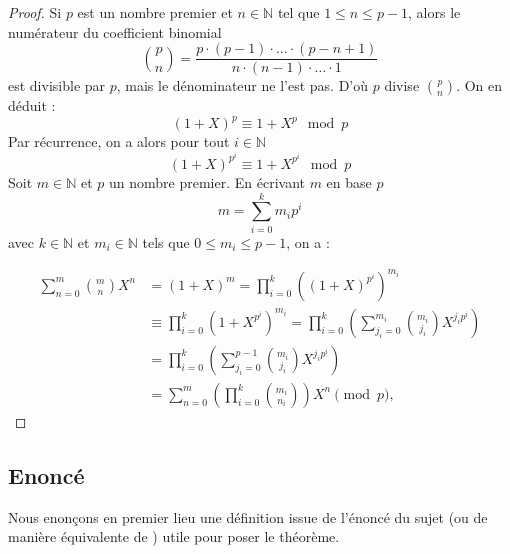 \documentclass{article}
\theoremstyle{definition}
\theoremstyle{plain}
\theoremstyle{plain}
\theoremstyle{plain}
\theoremstyle{plain}
\theoremstyle{definition}
\theoremstyle{plain}
\theoremstyle{plain}
\begin{document}
\begin{proof}
	Si \( p \) est un nombre premier et \( n \in \mathbb{N}\) tel que \( 1 \leq n \leq p-1 \), alors le numérateur du coefficient binomial 
\begin{equation*}
	\binom{p}{n} = \frac{p \cdot (p-1) \cdot \ldots \cdot (p-n+1)}{n \cdot (n-1) \cdot \ldots \cdot 1}
\end{equation*}
est divisible par \( p \), mais le dénominateur ne l'est pas. D'où \( p \) divise \( \binom{p}{n} \). On en déduit : 
\begin{equation*}
	(1 + X)^p \equiv 1 + X^p \mod{p}
\end{equation*}
Par récurrence, on a alors pour tout \( i \in \mathbb{N} \)
\begin{equation*}
	(1 + X)^{p^i} \equiv 1 + X^{p^i} \mod{p}
\end{equation*}
Soit \( m \in \mathbb{N}\) et \( p \) un nombre premier. 
En écrivant \( m \) en base \( p \) 
\begin{equation*}
	m = \sum_{i=0}^{k} m_i p^i
\end{equation*}
avec \( k \in \mathbb{N} \) et \( m_i \in \mathbb{N} \) tels que \( 0 \leq m_i \leq p-1 \), on a : 

\begin{align*}
	\sum_{n=0}^{m} \binom{m}{n} X^n &= (1+X)^m = \prod_{i=0}^{k} \left((1+X)^{p^i}\right)^{m_i} \\
&\equiv \prod_{i=0}^{k} \left(1 + X^{p^i}\right)^{m_i} = \prod_{i=0}^{k} \left(\sum_{j_i=0}^{m_i} \binom{m_i}{j_i} X^{j_i p^i}\right) \\
&= \prod_{i=0}^{k} \left(\sum_{j_i=0}^{p-1} \binom{m_i}{j_i} X^{j_i p^i}\right) \\
&= \sum_{n=0}^{m} \left(\prod_{i=0}^{k} \binom{m_i}{n_i}\right) X^n \pmod{p},
\end{align*}
\end{proof}

\subsection{Enoncé}

\par Nous enonçons en premier lieu une définition issue de l'énoncé du sujet (ou de manière équivalente de \cite[p. ~123 et 139]{dummit2003abstract}) utile pour poser le théorème.
\end{document}
